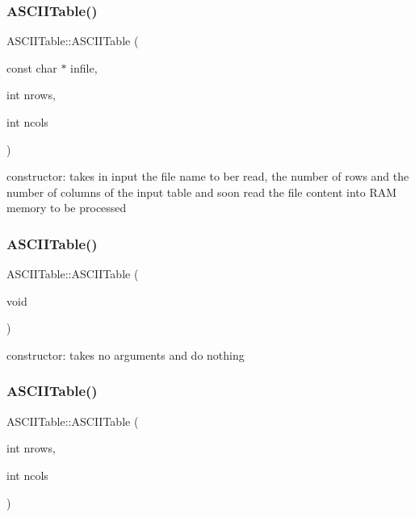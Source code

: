 \subsubsection{\texorpdfstring{A\+S\+C\+I\+I\+Table()}{ASCIITable()}\hspace{0.1cm}{\footnotesize\ttfamily [1/3]}}
{\footnotesize\ttfamily A\+S\+C\+I\+I\+Table\+::\+A\+S\+C\+I\+I\+Table (\begin{DoxyParamCaption}\item[{const char $\ast$}]{infile,  }\item[{int}]{nrows,  }\item[{int}]{ncols }\end{DoxyParamCaption})}



constructor\+: takes in input the file name to ber read, the number of rows and the number of columns of the input table and soon read the file content into R\+AM memory to be processed 

\mbox{\label{classASCIITable_a75a7961697d0ed657c23b3c823c19e7f}} 
\subsubsection{\texorpdfstring{A\+S\+C\+I\+I\+Table()}{ASCIITable()}\hspace{0.1cm}{\footnotesize\ttfamily [2/3]}}
{\footnotesize\ttfamily A\+S\+C\+I\+I\+Table\+::\+A\+S\+C\+I\+I\+Table (\begin{DoxyParamCaption}\item[{void}]{ }\end{DoxyParamCaption})}



constructor\+: takes no arguments and do nothing 

\mbox{\label{classASCIITable_ae222c329fe48cc1d681761008f10729f}} 
\subsubsection{\texorpdfstring{A\+S\+C\+I\+I\+Table()}{ASCIITable()}\hspace{0.1cm}{\footnotesize\ttfamily [3/3]}}
{\footnotesize\ttfamily A\+S\+C\+I\+I\+Table\+::\+A\+S\+C\+I\+I\+Table (\begin{DoxyParamCaption}\item[{int}]{nrows,  }\item[{int}]{ncols }\end{DoxyParamCaption})}



